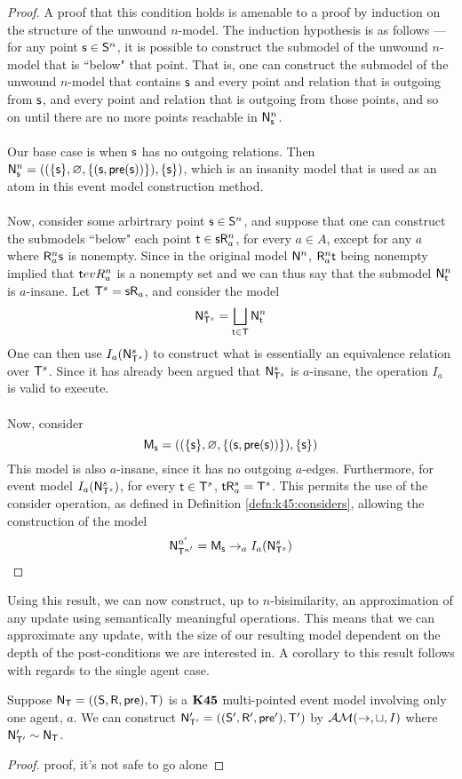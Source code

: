 \begin{proof}
	A proof that this condition holds is amenable to a proof  by induction on the structure of the unwound $n$-model.
	The induction hypothesis is as follows --- for any point $\mathrm{\mathsf{s}} \in \mathrm{\mathsf{S}}^n$, it is possible to construct the submodel of
	the unwound $n$-model that is ``below" that point.
	That is, one can construct the submodel of the unwound $n$-model that contains $\mathrm{\mathsf{s}}$ and every
	point and relation that is outgoing from $\mathrm{\mathsf{s}}$, and every point and relation that is outgoing
	from those points, and so on until there are no more points reachable in $\mathrm{\mathsf{N}}^n_{\mathrm{\mathsf{s}}}$.\\
	\\
	Our base case is when $\mathrm{\mathsf{s}}$ has no outgoing relations.
	Then $\mathrm{\mathsf{N}}^n_{\mathrm{\mathsf{s}}} = ((\{\mathrm{\mathsf{s}}\}, \varnothing, \{(\mathrm{\mathsf{s}},\mathrm{\mathsf{pre}}(\mathrm{\mathsf{s}}))\}),\{\mathrm{\mathsf{s}}\})$, which is an
	insanity model that is used as an atom in this event model construction method.\\
	\\
	Now, consider some arbirtrary point $\mathrm{\mathsf{s}} \in \mathrm{\mathsf{S}}^n$, and suppose that one can construct the submodels
	``below" each point $\mathrm{\mathsf{t}} \in \mathrm{\mathsf{s}} \mathrm{\mathsf{R}}^n_a$, for every $a \in A$, except for any $a$ where
	$\mathrm{\mathsf{R}}^n_a
	\mathrm{\mathsf{s}}$ is nonempty.
	Since in the original model $\mathrm{\mathsf{N}}^n$, $\mathrm{\mathsf{R}}^n_a \mathrm{\mathsf{t}}$ being nonempty implied that $\mathrm{\mathsf{t}} evR^n_a$
	is a nonempty set and we can thus say that the submodel $\mathrm{\mathsf{N}}^n_\mathrm{\mathsf{t}}$ is $a$-insane.
	Let $\mathrm{\mathsf{T}}^s = \mathrm{\mathsf{s}} \mathrm{\mathsf{R}}_a$, and consider the model
	\[
		\mathrm{\mathsf{N}}^s_{\mathrm{\mathsf{T}}^s} = \bigsqcup_{\mathrm{\mathsf{t}} \in \mathrm{\mathsf{T}}} \mathrm{\mathsf{N}}^n_\mathrm{\mathsf{t}}
	\]
	One can then use $I_a(\mathrm{\mathsf{N}}^s_{\mathrm{\mathsf{T}}^s})$ to construct what is essentially an equivalence relation
	over $\mathrm{\mathsf{T}}^s$.
	Since it has already been argued that $\mathrm{\mathsf{N}}^s_{\mathrm{\mathsf{T}}^s}$ is $a$-insane, the operation $I_a$ is
	valid to execute.\\
	\\
	Now, consider
	\[
		\mathrm{\mathsf{M}}_\mathrm{\mathsf{s}} = ((\{\mathrm{\mathsf{s}}\}, \varnothing, \{(\mathrm{\mathsf{s}},\mathrm{\mathsf{pre}}(\mathrm{\mathsf{s}}))\}),\{\mathrm{\mathsf{s}}\})
	\]
	This model is also $a$-insane, since it has no outgoing $a$-edges.
	Furthermore, for event model $I_a(\mathrm{\mathsf{N}}^s_{\mathrm{\mathsf{T}}^s})$, for every $\mathrm{\mathsf{t}} \in \mathrm{\mathsf{T}}^s$, $\mathrm{\mathsf{t}} \mathrm{\mathsf{R}}^s_a =
	\mathrm{\mathsf{T}}^s$.
	This permits the use of the consider operation, as defined in Definition
	\ref{defn:k45:considers}, allowing the construction of the model
	\[
		\mathrm{\mathsf{N}}^{n'}_{\mathrm{\mathsf{T}}^{n'}} = \mathrm{\mathsf{M}}_\mathrm{\mathsf{s}} \to_a I_a(\mathrm{\mathsf{N}}^s_{\mathrm{\mathsf{T}}^s})
	\]
\end{proof}

Using this result, we can now construct, up to $n$-bisimilarity, an
approximation of any update using semantically meaningful operations.
This means that we can approximate any update, with the size of our resulting
model dependent on the depth of the post-conditions we are interested in.
A corollary to this result follows with regards to the single agent case.

\begin{corr}
  Suppose $\mathrm{\mathsf{N}}_\mathrm{\mathsf{T}} = ((\mathrm{\mathsf{S}},\mathrm{\mathsf{R}},\mathrm{\mathsf{pre}}),\mathrm{\mathsf{T}})$ is a $\bf K45$ multi-pointed
  event model involving only one agent, $a$.
  We can construct $\mathrm{\mathsf{N}}'_{\mathrm{\mathsf{T}}'} = ((\mathrm{\mathsf{S}}',\mathrm{\mathsf{R}}',\mathrm{\mathsf{pre}}'),\mathrm{\mathsf{T}}')$ by
  $\mathcal{AM}(\to,\sqcup,I)$ where $\mathrm{\mathsf{N}}'_{\mathrm{\mathsf{T}}'} \sim \mathrm{\mathsf{N}}_\mathrm{\mathsf{T}}$.
\end{corr}
\begin{proof}
	\FIXME proof, it's not safe to go alone
\end{proof}
